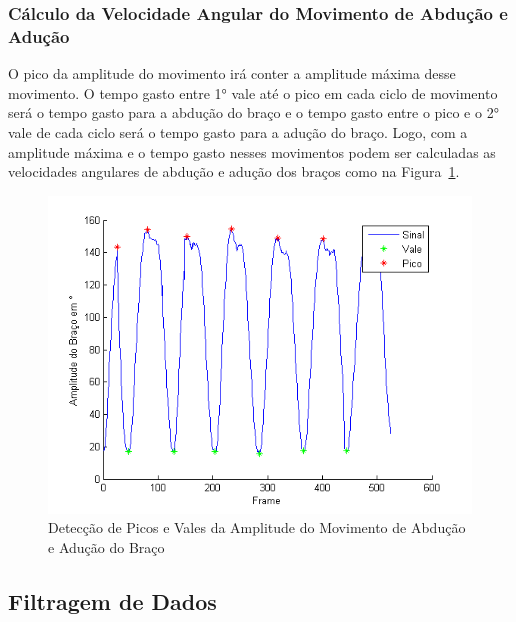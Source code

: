 \subsubsection{Cálculo da Velocidade Angular do Movimento de Abdução e Adução}
O pico da amplitude do movimento irá conter a amplitude máxima desse movimento. O tempo gasto entre 1° vale até o pico em cada ciclo de movimento será o tempo gasto para a abdução do braço e o tempo gasto entre o pico e o 2° vale de cada ciclo será o tempo gasto para a adução do braço. Logo, com a amplitude máxima e o tempo gasto nesses movimentos podem ser calculadas as velocidades angulares de abdução e adução dos braços como na Figura~\ref{img:amplitude_braco_picos_vales}.
\begin{figure}[!htb]
     \centering
     \includegraphics[width=1\textwidth]{./img/amplitude-braco-picos.png}
     \caption{Detecção de Picos e Vales da Amplitude do Movimento de Abdução e Adução do Braço}
     \label{img:amplitude_braco_picos_vales}
\end{figure}

\subsection{Filtragem de Dados}\label{section:filtro_dados}


